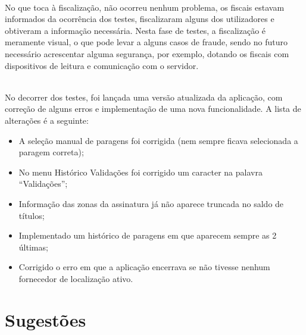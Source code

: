 ~\\No que toca à fiscalização, não ocorreu nenhum problema, os fiscais estavam informados da ocorrência dos testes, fiscalizaram alguns dos utilizadores e obtiveram a informação necessária. Nesta fase de testes, a fiscalização é meramente visual, o que pode levar a alguns casos de fraude, sendo no futuro necessário acrescentar alguma segurança, por exemplo, dotando os fiscais com dispositivos de leitura e comunicação com o servidor.

~\\No decorrer dos testes, foi lançada uma versão atualizada da aplicação, com correção de alguns erros e implementação de uma nova funcionalidade. A lista de alterações é a seguinte:
\begin{itemize}
\item A seleção manual de paragens foi corrigida (nem sempre ficava selecionada a paragem correta);
\item No menu Histórico Validações foi corrigido um caracter na palavra “Validações”;
\item Informação das zonas da assinatura já não aparece truncada no saldo de títulos;
\item Implementado um histórico de paragens em que aparecem sempre as 2 últimas;
\item Corrigido o erro em que a aplicação encerrava se não tivesse nenhum fornecedor de localização ativo.
\end{itemize}

\section{Sugestões}
\label{sec:sugestoes}

